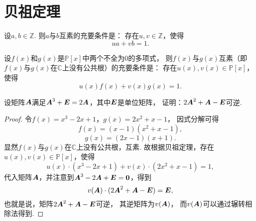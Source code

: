 \section{贝祖定理}
\begin{theorem}
设\(a,b\in\mathbb{Z}\).
则\(a\)与\(b\)互素的充要条件是：
存在\(u,v\in\mathbb{Z}\)，使得\[
	u a + v b = 1.
\]
\end{theorem}

\begin{corollary}
设\(f(x)\)和\(g(x)\)是\(\mathbb{P}[x]\)中两个不全为0的多项式，
则\(f(x)\)与\(g(x)\)互素（即\(f(x)\)与\(g(x)\)在\(\mathbb{C}\)上没有公共根）的充要条件是：
存在\(u(x),v(x)\in\mathbb{P}[x]\)，使得\[
	u(x) f(x) + v(x) g(x) = 1.
\]
\end{corollary}

\begin{example}
设矩阵\(\boldsymbol{A}\)满足\(\boldsymbol{A}^3+\boldsymbol{E}=2\boldsymbol{A}\)，其中\(\boldsymbol{E}\)是单位矩阵，
证明：\(2\boldsymbol{A}^2+\boldsymbol{A}-\boldsymbol{E}\)可逆.
\begin{proof}
令\(f(x)=x^3-2x+1\)，\(g(x)=2x^2+x-1\)，
因式分解可得\[
	f(x) = (x-1)(x^2+x-1),
\]\[
	g(x) = (2x-1)(x+1).
\]
显然\(f(x)\)与\(g(x)\)在\(\mathbb{C}\)上没有公共根，互素.
故根据贝祖定理，存在\(u(x),v(x)\in\mathbb{P}[x]\)，使得\[
	u(x) \cdot (x^3-2x+1) + v(x) \cdot (2x^2+x-1) = 1,
\]
代入矩阵\(\boldsymbol{A}\)，并注意到\(\boldsymbol{A}^3-2\boldsymbol{A}+\boldsymbol{E}=\boldsymbol{0}\)，得到\[
	v(\boldsymbol{A}) \cdot (2\boldsymbol{A}^2+\boldsymbol{A}-\boldsymbol{E}) = \boldsymbol{E},
\]
也就是说，矩阵\(2\boldsymbol{A}^2+\boldsymbol{A}-\boldsymbol{E}\)可逆，
其逆矩阵为\(v(\boldsymbol{A})\)，
而\(v(\boldsymbol{A})\)可以通过辗转相除法得到.
\end{proof}
\end{example}

